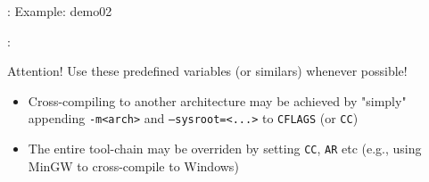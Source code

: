 \begin{frame}{\secname: \small\subsecname\normalsize}
    Example: demo02
\end{frame}

\begin{frame}{\secname: \small\subsecname\normalsize}
    \begin{alertblock}{Attention!}
        Use these predefined variables (or similars) whenever possible!
    \end{alertblock}

    \begin{itemize}
        \item Cross-compiling to another architecture may be achieved
        by "simply" appending \texttt{-m<arch>} and
        \texttt{--sysroot=<...>} to \texttt{CFLAGS} (or \texttt{CC})

        \item The entire tool-chain may be overriden by setting
        \texttt{CC}, \texttt{AR} etc (e.g., using MinGW to
        cross-compile to Windows)
    \end{itemize}
\end{frame}
